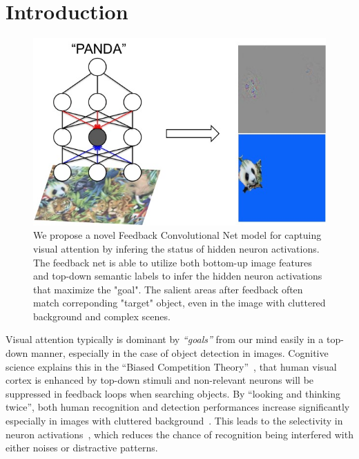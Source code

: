 \section{Introduction}

\begin{center}
\end{center}

\setlength{\tabcolsep}{2pt}
\begin{figure}[htb]
\begin{center}
\includegraphics[width=0.95\columnwidth]{figs/splash/splash}
\caption{We propose a novel Feedback Convolutional Net model for captuing visual attention by infering the status of hidden neuron activations. The feedback net is able to utilize both bottom-up image features and top-down semantic labels to infer the hidden neuron activations that maximize the "goal". The salient areas after feedback often match correponding "target" object, even in the image with cluttered background and complex scenes. }
\label{fig:splash0}
\vspace{-10pt}
\end{center}
\end{figure}

Visual attention typically is dominant by \emph{``goals''} from our mind easily in a top-down manner, especially in the case of object detection in images. Cognitive science explains this in the ``Biased Competition Theory''~\cite{beck2009top,desimone1998visual,desimone1995neural}, that human visual cortex is enhanced by top-down stimuli and non-relevant neurons will be suppressed in feedback loops when searching objects. By ``looking and thinking twice'', both human recognition and detection performances increase significantly especially in images with cluttered background~\cite{Cichy2014Resolving}. This leads to the selectivity in neuron activations~\cite{Kruger2013Deep}, which reduces the chance of recognition being interfered with either noises or distractive patterns.

